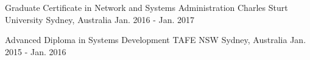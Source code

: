 

\begin{cventries}

  \cventry
    {Graduate Certificate in Network and Systems Administration} %
    {Charles Sturt University} %
    {Sydney, Australia} %
    {Jan. 2016 - Jan. 2017} %
   {
      \begin{cvitems} %
      \end{cvitems}
    }


  \cventry
    {Advanced Diploma in Systems Development} %
    {TAFE NSW} %
    {Sydney, Australia} %
    {Jan. 2015 - Jan. 2016} %
   {
      \begin{cvitems} %
      \end{cvitems}
    }

\end{cventries}
